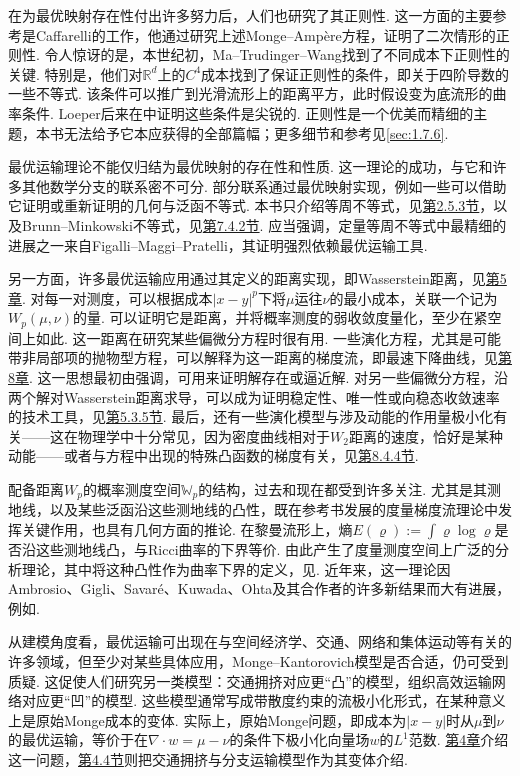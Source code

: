 \label{idx:i123-pxvii}
在为最优映射存在性付出许多努力后，人们也研究了其正则性. 这一方面的主要参考是Caffarelli的工作，他通过研究上述Monge--Ampère方程，证明了二次情形的正则性. 令人惊讶的是，本世纪初，Ma--Trudinger--Wang\cite{b219}找到了不同成本下正则性的关键. 特别是，他们对$\mathbb R^d$上的$C^4$成本找到了保证正则性的条件，即关于四阶导数的一些不等式. 该条件可以推广到光滑流形上的距离平方，此时假设变为底流形的曲率条件. Loeper后来在\cite{b216}中证明这些条件是尖锐的. 正则性是一个优美而精细的主题，本书无法给予它本应获得的全部篇幅；更多细节和参考见\autoref{sec:1.7.6}.

最优运输理论不能仅归结为最优映射的存在性和性质. 这一理论的成功，与它和许多其他数学分支的联系密不可分. 部分联系通过最优映射实现，例如一些可以借助它证明或重新证明的几何与泛函不等式. 本书只介绍等周不等式，见\hyperref[sec:2.5.3]{第2.5.3节}，以及Brunn--Minkowski不等式，见\hyperref[sec:7.4.2]{第7.4.2节}. 应当强调，定量等周不等式中最精细的进展之一来自Figalli--Maggi--Pratelli，其证明强烈依赖最优运输工具\cite{b167}.

另一方面，许多最优运输应用通过其定义的距离实现，即Wasserstein距离，见\hyperref[sec:5]{第5章}. 对每一对测度，可以根据成本$|x-y|^p$下将$\mu$运往$\nu$的最小成本，关联一个记为$W_p(\mu,\nu)$的量. 可以证明它是距离，并将概率测度的弱收敛度量化，至少在紧空间上如此. 这一距离在研究某些偏微分方程时很有用. 一些演化方程，尤其是可能带非局部项的抛物型方程，可以解释为这一距离的梯度流，即最速下降曲线，见\hyperref[sec:8]{第8章}. 这一思想最初由\cite{b198,b246}强调，可用来证明解存在或逼近解. 对另一些偏微分方程，沿两个解对Wasserstein距离求导，可以成为证明稳定性、唯一性或向稳态收敛速率的技术工具，见\hyperref[sec:5.3.5]{第5.3.5节}. 最后，还有一些演化模型与涉及动能的作用量极小化有关——这在物理学中十分常见，因为密度曲线相对于$W_2$距离的速度，恰好是某种动能——或者与方程中出现的特殊凸函数的梯度有关，见\hyperref[sec:8.4.4]{第8.4.4节}.

配备距离$W_p$的概率测度空间$\mathbb W_p$的结构，过去和现在都受到许多关注. 尤其是其测地线，以及某些泛函沿这些测地线的凸性，既在参考书\cite{b15}发展的度量梯度流理论中发挥关键作用，也具有几何方面的推论. 在黎曼流形上，熵$E(\varrho):=\int\varrho\log\varrho$是否沿这些测地线凸，与Ricci曲率的下界等价. 由此产生了度量测度空间上广泛的分析理论，其中将这种凸性作为曲率下界的定义，见\cite{b218,b288,b289}. 近年来，这一理论因Ambrosio、Gigli、Savaré、Kuwada、Ohta及其合作者的许多新结果而大有进展，例如\cite{b18,b183}.

从建模角度看，最优运输可出现在与空间经济学、交通、网络和集体运动等有关的许多领域，但至少对某些具体应用，Monge--Kantorovich模型是否合适，仍可受到质疑. 这促使人们研究另一类模型：交通拥挤对应更“凸”的模型，组织高效运输网络对应更“凹”的模型. 这些模型通常写成带散度约束的流极小化形式，在某种意义上是原始Monge成本的变体. 实际上，原始Monge问题，即成本为$|x-y|$时从$\mu$到$\nu$的最优运输，等价于在$\nabla\cdot w=\mu-\nu$的条件下极小化向量场$w$的$L^1$范数. \hyperref[sec:4]{第4章}介绍这一问题，\hyperref[sec:4.4]{第4.4节}则把交通拥挤与分支运输模型作为其变体介绍.

